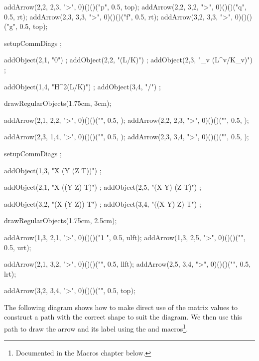   addArrow(2,2, 2,3, ">", 0)()()("p", 0.5, top);
  addArrow(2,2, 3,2, ">", 0)()()("q", 0.5, rt);
  addArrow(2,3, 3,3, ">", 0)()()("f", 0.5, rt);
  addArrow(3,2, 3,3, ">", 0)()()("g", 0.5, top);
\stopMPcode\stopformula
\stopbuffer

\processTEXbuffer

\typebuffer

\blank[2*big]

\startbuffer
\startformula{}
  setupCommDiags ;
  
  addObject(2,1, "0") ;
  addObject(2,2, "(L/K)") ;
  addObject(2,3, "\bigoplus_v (L^v/K_v)") ;
  
  addObject(1,4, "H^2(L/K)") ;
  addObject(3,4, "/") ;
    
  drawRegularObjects(1.75cm, 3cm);
  
  addArrow(2,1, 2,2, ">", 0)()()("", 0.5, );
  addArrow(2,2, 2,3, ">", 0)()()("", 0.5, );
  
  addArrow(2,3, 1,4, ">", 0)()()("", 0.5, );
  addArrow(2,3, 3,4, ">", 0)()()("", 0.5, );
\stopMPcode\stopformula
\stopbuffer

\processTEXbuffer

\typebuffer

\blank[2*big]

\startbuffer
\startformula{}
  setupCommDiags ;
  
  addObject(1,3, "X \otimes (Y \otimes (Z \otimes T))") ;
  
  addObject(2,1, "X \otimes ((Y \otimes Z) \otimes T)") ;
  addObject(2,5, "(X \otimes Y) \otimes (Z \otimes T)") ;
  
  addObject(3,2, "(X \otimes (Y \otimes Z)) \otimes T") ;
  addObject(3,4, "((X \otimes Y) \otimes Z) \otimes T") ;
    
  drawRegularObjects(1.75cm, 2.5cm);
  
  addArrow(1,3, 2,1, ">", 0)()()("1 \otimes \phi", 0.5, ulft);
  addArrow(1,3, 2,5, ">", 0)()()("\phi", 0.5, urt);
  
  addArrow(2,1, 3,2, ">", 0)()()("\phi", 0.5, llft);
  addArrow(2,5, 3,4, ">", 0)()()("\phi", 0.5, lrt);
  
  addArrow(3,2, 3,4, ">", 0)()()("\phi {}", 0.5, top);
\stopMPcode\stopformula
\stopbuffer

\processTEXbuffer

\typebuffer

\blank[2*big]

The following diagram shows how to make direct use of the  
matrix values to construct a path with the correct shape to suit the 
diagram. We then use this path to draw the arrow and its label using the 
 and  macros\footnote{Documented in 
the Macros chapter below.}. 

